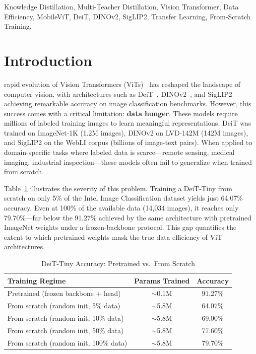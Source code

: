 \documentclass[journal]{IEEEtran}
\begin{document}
\begin{IEEEkeywords}
Knowledge Distillation, Multi-Teacher Distillation, Vision Transformer, Data Efficiency,
MobileViT, DeiT, DINOv2, SigLIP2, Transfer Learning, From-Scratch Training.
\end{IEEEkeywords}

\section{Introduction}
\label{sec:introduction}

 rapid evolution of Vision Transformers (ViTs)~\cite{dosovitskiy2021vit}
has reshaped the landscape of computer vision, with architectures such as DeiT~\cite{touvron2021deit},
DINOv2~\cite{oquab2023dinov2}, and SigLIP2~\cite{zhai2023siglip, tschannen2025siglip2} achieving
remarkable accuracy on image classification benchmarks. However, this success comes with a critical
limitation: \textbf{data hunger}. These models require millions of labeled training images to learn
meaningful representations. DeiT was trained on ImageNet-1K (1.2M images), DINOv2 on LVD-142M
(142M images), and SigLIP2 on the WebLI corpus (billions of image-text pairs). When applied to
domain-specific tasks where labeled data is scarce---remote sensing, medical imaging, industrial
inspection---these models often fail to generalize when trained from scratch.

Table~\ref{tab:data_hunger_problem} illustrates the severity of this problem. Training a DeiT-Tiny
from scratch on only 5\% of the Intel Image Classification dataset yields just 64.07\% accuracy.
Even at 100\% of the available data (14,034 images), it reaches only 79.70\%---far below the
91.27\% achieved by the same architecture with pretrained ImageNet weights under a frozen-backbone
protocol. This gap quantifies the extent to which pretrained weights mask the true data efficiency
of ViT architectures.

\begin{table}[!t]
\renewcommand{\arraystretch}{1.3}
\caption{DeiT-Tiny Accuracy: Pretrained vs.\ From Scratch}
\label{tab:data_hunger_problem}
\centering
\begin{tabular}{lcc}
\toprule
\textbf{Training Regime} & \textbf{Params Trained} & \textbf{Accuracy} \\
\midrule
Pretrained (frozen backbone + head) & $\sim$0.1M & 91.27\% \\
From scratch (random init, 5\% data)  & $\sim$5.8M & 64.07\% \\
From scratch (random init, 10\% data) & $\sim$5.8M & 69.00\% \\
From scratch (random init, 50\% data) & $\sim$5.8M & 77.60\% \\
From scratch (random init, 100\% data) & $\sim$5.8M & 79.70\% \\
\bottomrule
\end{tabular}
\end{table}
\end{document}
